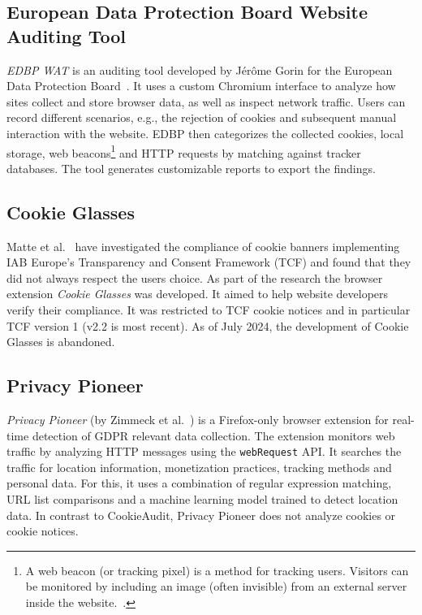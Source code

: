 \subsection{European Data Protection Board Website Auditing Tool}
\emph{EDBP WAT} is an auditing tool developed by Jérôme Gorin for the European Data Protection Board~\cite{gorin2024edpb}.
It uses a custom Chromium interface to analyze how sites collect and store browser data, as well as inspect network traffic. 
Users can record different scenarios, e.g., the rejection of cookies and subsequent manual interaction with the website.
EDBP then categorizes the collected cookies, local storage, web beacons\footnote{
A web beacon (or tracking pixel) is a method for tracking users. 
Visitors can be monitored by including an image (often invisible) from an external server inside the website.~\cite{smith1999web}.
} and HTTP requests by matching against tracker databases.
The tool generates customizable reports to export the findings.

\subsection{Cookie Glasses}
Matte et al.~\cite{matte2020cookiebannersrespectchoice} have investigated the compliance of cookie banners implementing IAB Europe’s Transparency and Consent Framework (TCF) and found that they did not always respect the users choice.
As part of the research the browser extension \emph{Cookie Glasses} was developed.
It aimed to help website developers verify their compliance.
It was restricted to TCF cookie notices and in particular TCF version 1 (v2.2 is most recent).
As of July 2024, the development of Cookie Glasses is abandoned.

\subsection{Privacy Pioneer}
\emph{Privacy Pioneer} (by Zimmeck et al.~\cite{zimmeck2024pioneer}) is a Firefox-only browser extension for real-time detection of GDPR relevant data collection.
The extension monitors web traffic by analyzing HTTP messages using the \verb|webRequest| API.
It searches the traffic for location information, monetization practices, tracking methods and personal data. 
For this, it uses a combination of regular expression matching, URL list comparisons and a machine learning model trained to detect location data.
In contrast to CookieAudit, Privacy Pioneer does not analyze cookies or cookie notices.

